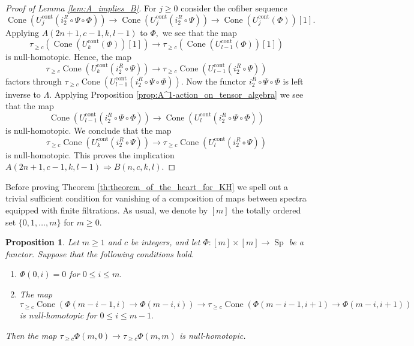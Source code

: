 \documentclass[11pt,leqno]{amsart}
\newtheorem{prop}[theo]{Proposition}
\numberwithin{equation}{section}
\newcommand{\Cone}{\operatorname{Cone}}
\newcommand{\cont}{\operatorname{cont}}
\newcommand{\Sp}{\operatorname{Sp}}
\begin{document}
\begin{proof}[Proof of Lemma \ref{lem:A_implies_B}]
For $j\geq 0$ consider the cofiber sequence
\begin{equation*}
\Cone(U_j^{\cont}(i_2^R\circ\Psi\circ\Phi))\to \Cone(U_j^{\cont}(i_2^R\circ\Psi))\to \Cone(U_j^{\cont}(\Phi))[1].
\end{equation*}
Applying $A(2n+1,c-1,k,l-1)$ to $\Phi,$ we see that the map
\begin{equation*}
\tau_{\geq c}(\Cone(U_k^{\cont}(\Phi))[1])\to \tau_{\geq c}(\Cone(U_{l-1}^{\cont}(\Phi))[1])
\end{equation*}
is null-homotopic. Hence, the map 
\begin{equation*}
\tau_{\geq c}\Cone(U_k^{\cont}(i_2^R\circ\Psi))\to \tau_{\geq c}\Cone(U_{l-1}^{\cont}(i_2^R\circ\Psi))
\end{equation*} factors through $\tau_{\geq c}\Cone(U_{l-1}^{\cont}(i_2^R\circ\Psi\circ\Phi)).$ Now the functor $i_2^R\circ\Psi\circ\Phi$ is left inverse to $\Lambda.$ Applying Proposition \ref{prop:A^1-action_on_tensor_algebra} we see that the map
\begin{equation*}
\Cone(U_{l-1}^{\cont}(i_2^R\circ\Psi\circ\Phi))\to \Cone(U_l^{\cont}(i_2^R\circ\Psi\circ\Phi))
\end{equation*}
is null-homotopic. We conclude that the map
\begin{equation*}
\tau_{\geq c}\Cone(U_k^{\cont}(i_2^R\circ\Psi))\to \tau_{\geq c}\Cone(U_l^{\cont}(i_2^R\circ\Psi))
\end{equation*}
is null-homotopic. This proves the implication $A(2n+1,c-1,k,l-1)\Rightarrow B(n,c,k,l).$
\end{proof}

Before proving Theorem \ref{th:theorem_of_the_heart_for_KH} we spell out a trivial sufficient condition for vanishing of a composition of maps between spectra equipped with finite filtrations. As usual, we denote by $[m]$ the totally ordered set $\{0,1,\dots,m\}$ for $m\geq 0.$

\begin{prop}\label{prop:composition_of_maps_between_filtered_spectra_vanishes}
Let $m\geq 1$ and $c$ be integers, and let $\Phi:[m]\times [m]\to\Sp$ be a functor. Suppose that the following conditions hold.
\begin{enumerate}[label=(\roman*),ref=(\roman*)]
	\item $\Phi(0,i)=0$ for $0\leq i\leq m.$ \label{first_column_vanishes}
	\item The map 
	\begin{equation*}
		\tau_{\geq c}\Cone(\Phi(m-i-1,i)\to \Phi(m-i,i))\to \tau_{\geq c}\Cone(\Phi(m-i-1,i+1)\to \Phi(m-i,i+1)) 
	\end{equation*} 
	is null-homotopic for $0\leq i\leq m-1.$ \label{from_row_i_to_row_i+1}
\end{enumerate}
Then the map $\tau_{\geq c}\Phi(m,0)\to\tau_{\geq c}\Phi(m,m)$ is null-homotopic. 
\end{prop}
\end{document}
